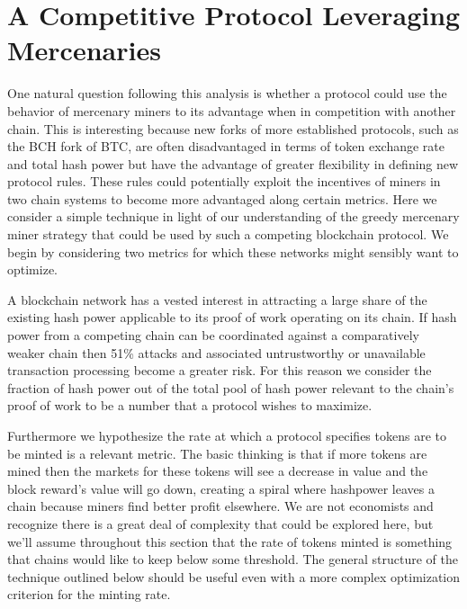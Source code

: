 \documentclass[10pt, preprint]{aastex}
\begin{document}
\section{A Competitive Protocol Leveraging Mercenaries}
One natural question following this analysis is whether a protocol could use the behavior of mercenary miners to its advantage when in competition with another chain.  This is interesting because new forks of more established protocols, such as the BCH fork of BTC, are often disadvantaged in terms of token exchange rate and total hash power but have the advantage of greater flexibility in defining new protocol rules.  These rules could potentially exploit the incentives of miners in two chain systems to become more advantaged along certain metrics.  Here we consider a simple technique in light of our understanding of the greedy mercenary miner strategy that could be used by such a competing blockchain protocol.  We begin by considering two metrics for which these networks might sensibly want to optimize.

A blockchain network has a vested interest in attracting a large share of the existing hash power applicable to its proof of work operating on its chain.  If hash power from a competing chain can be coordinated against a comparatively weaker chain then 51\% attacks and associated untrustworthy or unavailable transaction processing become a greater risk.  For this reason we consider the fraction of hash power out of the total pool of hash power relevant to the chain's proof of work to be a number that a protocol wishes to maximize.

Furthermore we hypothesize the rate at which a protocol specifies tokens are to be minted is a relevant metric.  The basic thinking is that if more tokens are mined then the markets for these tokens will see a decrease in value and the block reward's value will go down, creating a spiral where hashpower leaves a chain because miners find better profit elsewhere. We are not economists and recognize there is a great deal of complexity that could be explored here, but we'll assume throughout this section that the rate of tokens minted is something that chains would like to keep below some threshold.  The general structure of the technique outlined below should be useful even with a more complex optimization criterion for the minting rate.
\end{document}
